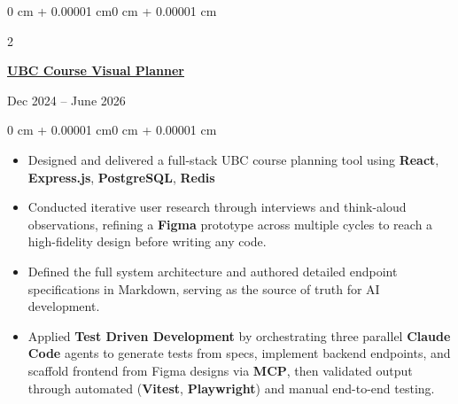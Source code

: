 \documentclass[10pt, letterpaper]{article}
\newenvironment{highlights}{
    \begin{itemize}[
        topsep=0.10 cm,
        parsep=0.10 cm,
        partopsep=0pt,
        itemsep=0pt,
        leftmargin=0 cm + 10pt
    ]
}{
    \end{itemize}
}
\newenvironment{onecolentry}{
    \begin{adjustwidth}{0 cm + 0.00001 cm}{0 cm + 0.00001 cm}
}{
    \end{adjustwidth}
}
\newenvironment{twocolentry}[2][]{
    \onecolentry
    \def\secondColumn{#2}
    \setcolumnwidth{\fill, 4.5 cm}
    \begin{paracol}{2}
}{
    \switchcolumn \raggedleft \secondColumn
    \end{paracol}
    \endonecolentry
}
\begin{document}
    


    \begin{twocolentry}{Dec 2024 -- June 2026}
        \href{https://github.com/DavidHua04/UBC-Courses-Visualization}{\textbf{UBC Course Visual Planner}}
    \end{twocolentry}

    \vspace{0.10 cm}
    \begin{onecolentry}
        \begin{highlights}
            \item Designed and delivered a full-stack UBC course planning tool using \textbf{React}, \textbf{Express.js}, \textbf{PostgreSQL}, \textbf{Redis}
            \item Conducted iterative user research through interviews and think-aloud observations,
            refining a \textbf{Figma} prototype across multiple cycles to reach a high-fidelity design before writing any code.
            \item Defined the full system architecture and authored detailed endpoint specifications in Markdown, serving as the source of truth for AI development.
            \item Applied \textbf{Test Driven Development} by orchestrating three parallel \textbf{Claude Code} agents to generate tests from specs,
            implement backend endpoints, and scaffold frontend from Figma designs via \textbf{MCP},
            then validated output through automated (\textbf{Vitest}, \textbf{Playwright}) and manual end-to-end testing.
        \end{highlights}
    \end{onecolentry}
    
\end{document}
